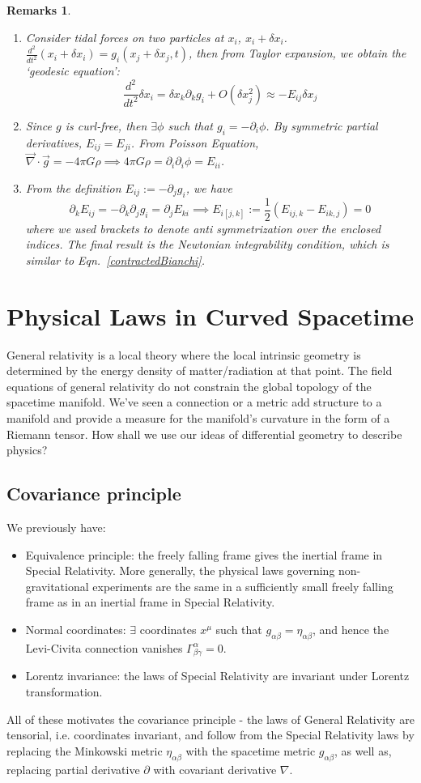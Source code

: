 \documentclass[a4paper]{article}
\newtheorem{remarks}{Remarks}[section]
\theoremstyle{new}
\begin{document}
\begin{remarks}\leavevmode
\begin{enumerate}
\item Consider tidal forces on two particles at $x_i$, $x_i+\delta x_i$. $\frac{d^2}{dt^2}(x_i+\delta x_i)=g_i(x_j+\delta x_j,t)$, then from Taylor expansion, we obtain the `geodesic equation':
$$\frac{d^2}{dt^2}\delta x_i=\delta x_k\partial_kg_i+O(\delta x_j^2)\approx -E_{ij}\delta x_j$$
\item Since $g$ is curl-free, then $\exists\phi$ such that $g_i=-\partial_i\phi$. By symmetric partial derivatives, $E_{ij}=E_{ji}$. From Poisson Equation, $\vec{\nabla}\cdot\vec{g}=-4\pi G\rho\implies4\pi G\rho=\partial_i\partial_i\phi=E_{ii}$. \item From the definition $E_{ij}:=-\partial_jg_i$, we have
$$\partial_kE_{ij}=-\partial_k\partial_jg_i=\partial_jE_{ki}\implies E_{i[j,k]}:=\frac{1}{2}(E_{ij,k}-E_{ik,j})=0$$
where we used brackets to denote anti symmetrization over the enclosed indices. The final result is the Newtonian integrability condition, which is similar to Eqn.~\ref{contractedBianchi}. 
\end{enumerate}
\end{remarks}
\newpage
\section{Physical Laws in Curved Spacetime}
General relativity is a local theory where the local intrinsic geometry is determined by the energy density of matter/radiation at that point. The field equations of general relativity do not constrain the global topology of the spacetime manifold. We've seen a connection or a metric add structure to a manifold and provide a measure for the manifold's curvature in the form of a Riemann tensor. How shall we use our ideas of differential geometry to describe physics?
\subsection{Covariance principle}
We previously have:
\begin{itemize}
    \item Equivalence principle: the freely falling frame gives the inertial frame in Special Relativity. More generally, the physical laws governing non-gravitational experiments are the same in a sufficiently small freely falling frame as in an inertial frame in Special Relativity.
    \item Normal coordinates: $\exists$ coordinates $x^\mu$ such that $g_{\alpha\beta}=\eta_{\alpha\beta}$, and hence the Levi-Civita connection vanishes $\Gamma^\alpha_{\beta\gamma}=0$.
    \item Lorentz invariance: the laws of Special Relativity are invariant under Lorentz transformation.
\end{itemize}
All of these motivates the covariance principle - the laws of General Relativity are tensorial, i.e. coordinates invariant, and follow from the Special Relativity laws by replacing the Minkowski metric $\eta_{\alpha\beta}$ with the spacetime metric $g_{\alpha\beta}$, as well as, replacing partial derivative $\partial$ with covariant derivative $\nabla$.
\end{document}
